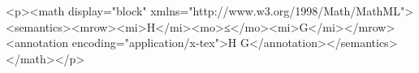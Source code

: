 <p><math display="block" xmlns="http://www.w3.org/1998/Math/MathML"><semantics><mrow><mi>H</mi><mo>≤</mo><mi>G</mi></mrow><annotation encoding="application/x-tex">H \leq G</annotation></semantics></math></p>
